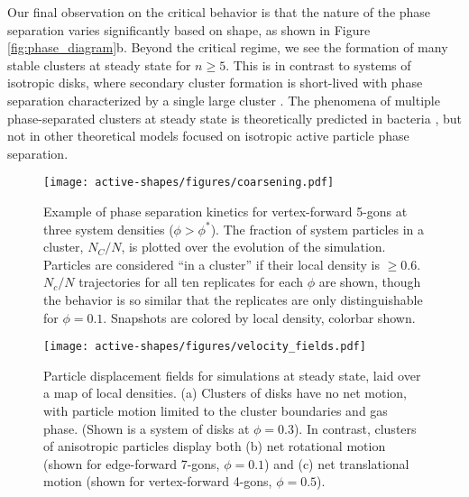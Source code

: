 Our final observation on the critical behavior is that the nature of the phase separation varies significantly based on shape, as shown in Figure \ref{fig:phase_diagram}b.
Beyond the critical regime, we see the formation of many stable clusters at steady state for $n{\geq}5$.
This is in contrast to systems of isotropic disks, where secondary cluster formation is short-lived with phase separation characterized by a single large cluster \cite{Redner_2013_PRE, Redner_2013_PRL}.
The phenomena of multiple phase-separated clusters at steady state is theoretically predicted in bacteria \cite{Cates_2010_PNAS}, but not in other theoretical models focused on isotropic active particle phase separation\cite{Fily_2012_PRL,Redner_2016_PRL}.

\begin{figure}[t]
\begin{center}
\texttt{[image: active-shapes/figures/coarsening.pdf]}
\caption{
Example of phase separation kinetics for vertex-forward 5-gons at three system densities ($\phi>\phi^*$).
The fraction of system particles in a cluster, $N_C/N$, is plotted over the evolution of the simulation.
Particles are considered ``in a cluster'' if their local density is $\geq0.6$.
$N_c/N$ trajectories for all ten replicates for each $\phi$ are shown, though the behavior is so similar that the replicates are only distinguishable for $\phi=0.1$.
Snapshots are colored by local density, colorbar shown.
}
\label{fig:coarsening}
\end{center}
\end{figure}

\begin{figure*}[t]
\begin{center}
\texttt{[image: active-shapes/figures/velocity\_fields.pdf]}
\caption{
Particle displacement fields for simulations at steady state, laid over a map of local densities.
(a) Clusters of disks have no net motion, with particle motion limited to the cluster boundaries and gas phase.
(Shown is a system of disks at $\phi=0.3$).
In contrast, clusters of anisotropic particles display both
(b) net rotational motion (shown for edge-forward 7-gons, $\phi=0.1$) and
(c) net translational motion (shown for vertex-forward 4-gons, $\phi=0.5$).
}
\label{fig:velocity}
\end{center}
\end{figure*}



